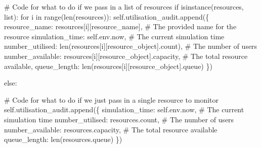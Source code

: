 \documentclass[
  letterpaper,
  DIV=11,
  numbers=noendperiod]{scrreprt}
\newenvironment{Shaded}{}{}
\newcommand{\BuiltInTok}[1]{\textcolor[rgb]{0.84,0.23,0.29}{#1}}
\newcommand{\CommentTok}[1]{\textcolor[rgb]{0.42,0.45,0.49}{#1}}
\newcommand{\ControlFlowTok}[1]{\textcolor[rgb]{0.84,0.23,0.29}{#1}}
\newcommand{\KeywordTok}[1]{\textcolor[rgb]{0.84,0.23,0.29}{#1}}
\newcommand{\NormalTok}[1]{\textcolor[rgb]{0.14,0.16,0.18}{#1}}
\newcommand{\StringTok}[1]{\textcolor[rgb]{0.01,0.18,0.38}{#1}}
\newcommand{\VariableTok}[1]{\textcolor[rgb]{0.89,0.38,0.04}{#1}}
\begin{document}
\begin{tcolorbox}
\begin{Shaded}
\begin{Highlighting}[]
            \CommentTok{\# Code for what to do if we pass in a list of resources}
            \ControlFlowTok{if} \BuiltInTok{isinstance}\NormalTok{(resources, }\BuiltInTok{list}\NormalTok{):}
                \ControlFlowTok{for}\NormalTok{ i }\KeywordTok{in} \BuiltInTok{range}\NormalTok{(}\BuiltInTok{len}\NormalTok{(resources)):}
                    \VariableTok{self}\NormalTok{.utilisation\_audit.append(\{}
                        \StringTok{\textquotesingle{}resource\_name\textquotesingle{}}\NormalTok{: resources[i][}\StringTok{\textquotesingle{}resource\_name\textquotesingle{}}\NormalTok{], }\CommentTok{\# The provided name for the resource}
                        \StringTok{\textquotesingle{}simulation\_time\textquotesingle{}}\NormalTok{: }\VariableTok{self}\NormalTok{.env.now,  }\CommentTok{\# The current simulation time}
                        \StringTok{\textquotesingle{}number\_utilised\textquotesingle{}}\NormalTok{: }\BuiltInTok{len}\NormalTok{(resources[i][}\StringTok{\textquotesingle{}resource\_object\textquotesingle{}}\NormalTok{].count), }\CommentTok{\# The number of users}
                        \StringTok{\textquotesingle{}number\_available\textquotesingle{}}\NormalTok{: resources[i][}\StringTok{\textquotesingle{}resource\_object\textquotesingle{}}\NormalTok{].capacity, }\CommentTok{\# The total resource available,}
                        \StringTok{\textquotesingle{}queue\_length\textquotesingle{}}\NormalTok{: }\BuiltInTok{len}\NormalTok{(resources[i][}\StringTok{\textquotesingle{}resource\_object\textquotesingle{}}\NormalTok{].queue)}
\NormalTok{                    \})}

            \ControlFlowTok{else}\NormalTok{:}

                \CommentTok{\# Code for what to do if we just pass in a single resource to monitor}
                \VariableTok{self}\NormalTok{.utilisation\_audit.append(\{}
                    \StringTok{\textquotesingle{}simulation\_time\textquotesingle{}}\NormalTok{: }\VariableTok{self}\NormalTok{.env.now,  }\CommentTok{\# The current simulation time}
                    \StringTok{\textquotesingle{}number\_utilised\textquotesingle{}}\NormalTok{: resources.count,  }\CommentTok{\# The number of users}
                    \StringTok{\textquotesingle{}number\_available\textquotesingle{}}\NormalTok{: resources.capacity, }\CommentTok{\# The total resource available}
                    \StringTok{\textquotesingle{}queue\_length\textquotesingle{}}\NormalTok{: }\BuiltInTok{len}\NormalTok{(resources.queue)}
\NormalTok{                \})}



\end{Highlighting}
\end{Shaded}
\end{tcolorbox}
\end{document}
